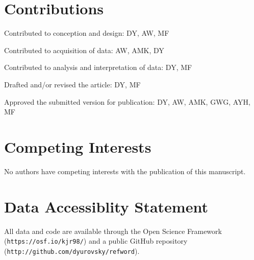 \documentclass[man,floatsintext]{apa6}
\begin{document}
\setlength\parindent{0pt}

\section{Contributions}

Contributed to conception and design: DY, AW, MF

Contributed to acquisition of data: AW, AMK, DY

Contributed to analysis and interpretation of data: DY, MF

Drafted and/or revised the article: DY, MF

Approved the submitted version for publication: DY, AW, AMK, GWG, AYH, MF

\section{Competing Interests}

No authors have competing interests with the publication of this manuscript.

\section{Data Accessiblity Statement}

All data and code are available through the Open Science Framework (\small{\tt{https://osf.io/kjr98/}}) and a public GitHub repository (\small{\tt{http://github.com/dyurovsky/refword}}).



\end{document}
